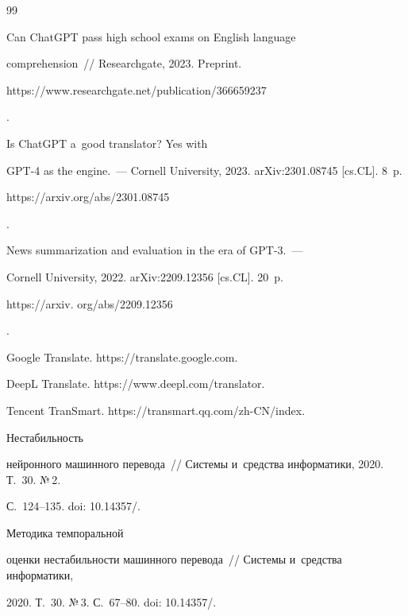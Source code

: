 {{\begin{thebibliography}{99}


 Can ChatGPT pass high school exams on English language 


comprehension~/\!\!/ Researchgate,  2023. Preprint. {\sf 


https://www.researchgate.net/\linebreak publication/366659237}. 




 Is ChatGPT a~good translator? Yes with  


GPT-4 as the engine.~--- Cornell University, 2023. arXiv:2301.08745 [cs.CL]. 8~p. {\sf 


https://arxiv.org/abs/2301.08745}.




 News summarization and evaluation in the era of GPT-3.~--- 


Cornell University, 2022. arXiv:2209.12356 [cs.CL]. 20~p. {\sf 


https://arxiv. org/abs/2209.12356}. 




Google Translate. {\sf https://translate.google.com}.




DeepL Translate. {\sf https://www.deepl.com/translator}.




Tencent TranSmart. {\sf https://transmart.qq.com/zh-CN/index}.




 Не\-ста\-биль\-ность 


нейронного машинного перевода~/\!\!/ Сис\-те\-мы и~средства информатики, 2020. Т.~30. №\,2. 


С.~124--135. doi: 10.14357\!/.




 Методика тем\-по\-раль\-ной 


оцен\-ки не\-ста\-биль\-ности ма\-шин\-но\-го пе\-ре\-во\-да~/\!\!/ Сис\-те\-мы и~средства ин\-фор\-ма\-ти\-ки, 


2020. Т.~30. №\,3. С.~67--80. doi: 10.14357\!/.





\end{thebibliography}}}
